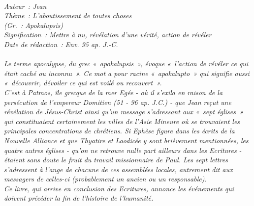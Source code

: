 \BFont
\noindent\hrulefill
{\footnotesize
\textit{
\bigskip
{\centering{}
\\Auteur~: Jean
\\Thème~: L'aboutissement de toutes choses
\\(Gr.~: Apokalupsis)
\\Signification~: Mettre à nu, révélation d'une vérité, action de révéler
\\Date de rédaction~: Env. 95 ap. J.-C.\\}
}
\textit{
\\Le terme apocalypse, du grec «~apokalupsis~», évoque «~l'action de révéler ce qui était caché ou inconnu~». Ce mot a pour racine «~apokalupto~» qui signifie aussi «~découvrir, dévoiler ce qui est voilé ou recouvert~».
\\C'est à Patmos, île grecque de la mer Egée - où il s'exila en raison de la persécution de l'empereur Domitien (51 - 96 ap. J.C.) - que Jean reçut une révélation de Jésus-Christ ainsi qu'un message s'adressant aux «~sept églises~» qui constituaient certainement les villes de l'Asie Mineure où se trouvaient les principales concentrations de chrétiens. Si Ephèse figure dans les écrits de la Nouvelle Alliance et que Thyatire et Laodicée y sont brièvement mentionnées, les quatre autres églises - qu'on ne retrouve nulle part ailleurs dans les Ecritures - étaient sans doute le fruit du travail missionnaire de Paul. Les sept lettres s'adressent à l'ange de chacune de ces assemblées locales, autrement dit aux messagers de celles-ci (probablement un ancien ou un responsable).
\\Ce livre, qui arrive en conclusion des Ecritures, annonce les événements qui doivent précéder la fin de l'histoire de l'humanité.\bigskip
}
} 
\par\nobreak\noindent\hrulefill
